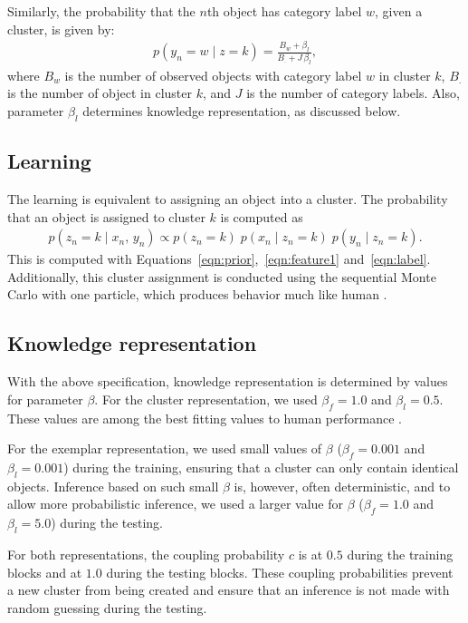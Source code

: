 \documentclass[doc]{apa6}
\begin{document}
Similarly, the probability that the $n$th object has category label $w$, given a cluster, is given by:
\begin{align}
    p(y_{n} = w \; \vert \; z = k) = \frac{B_{w} + \beta_{l}}{B_{.} + J \, \beta_{l}},
\label{eqn:label}
\end{align}
where $B_{w}$ is the number of observed objects with category label $w$ in cluster $k$, $B_{.}$ is
the number of object in cluster $k$, and $J$ is the number of category labels. Also, parameter
$\beta_{l}$ determines knowledge representation, as discussed below.


\subsection{Learning}

The learning is equivalent to assigning an object into a cluster. The probability that an object is
assigned to cluster $k$ is computed as
\begin{align}
    p(z_{n} = k \;\vert\; x_{n},\, y_{n}) \propto
    p(z_{n} = k)
    \;
    p(x_{n} \;\vert\; z_{n} = k)
    \;
    p(y_{n} \;\vert\; z_{n} = k).
\label{eqn:learning}
\end{align}
This is computed with Equations~\ref{eqn:prior},~\ref{eqn:feature1} and~\ref{eqn:label}.
Additionally, this cluster assignment is conducted using the sequential Monte Carlo with one
particle, which produces behavior much like human \parencite{Sanborn2010a}.


\subsection{Knowledge representation}

With the above specification, knowledge representation is determined by values for parameter
$\beta$.  For the cluster representation, we used $\beta_{f}=1.0$ and $\beta_{l}=0.5$. These values
are among the best fitting values to human performance \parencite{Sanborn2010a}.

For the exemplar representation, we used small values of $\beta$ ($\beta_{f}=0.001$ and
$\beta_{l}=0.001$) during the training, ensuring that a cluster can only contain identical objects.
Inference based on such small $\beta$ is, however, often deterministic, and to allow more
probabilistic inference, we used a larger value for $\beta$ ($\beta_{f}=1.0$ and $\beta_{l}=5.0$)
during the testing.

For both representations, the coupling probability $c$ is at $0.5$ during the training blocks and at
$1.0$ during the testing blocks. These coupling probabilities prevent a new cluster from being
created and ensure that an inference is not made with random guessing during the testing.

\end{document}
